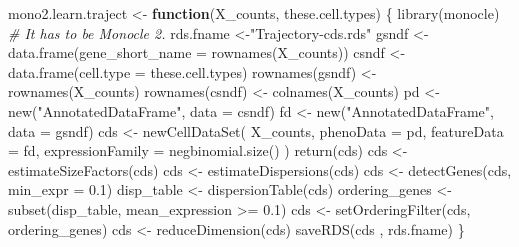 \documentclass[
  openany]{book}
\newenvironment{Shaded}{\begin{snugshade}}{\end{snugshade}}
\newcommand{\AttributeTok}[1]{\textcolor[rgb]{0.77,0.63,0.00}{#1}}
\newcommand{\CommentTok}[1]{\textcolor[rgb]{0.56,0.35,0.01}{\textit{#1}}}
\newcommand{\ControlFlowTok}[1]{\textcolor[rgb]{0.13,0.29,0.53}{\textbf{#1}}}
\newcommand{\FloatTok}[1]{\textcolor[rgb]{0.00,0.00,0.81}{#1}}
\newcommand{\FunctionTok}[1]{\textcolor[rgb]{0.00,0.00,0.00}{#1}}
\newcommand{\NormalTok}[1]{#1}
\newcommand{\OtherTok}[1]{\textcolor[rgb]{0.56,0.35,0.01}{#1}}
\newcommand{\SpecialCharTok}[1]{\textcolor[rgb]{0.00,0.00,0.00}{#1}}
\newcommand{\StringTok}[1]{\textcolor[rgb]{0.31,0.60,0.02}{#1}}
\begin{document}
\begin{Shaded}
\begin{Highlighting}[]
\NormalTok{mono2.learn.traject }\OtherTok{\textless{}{-}}
  \ControlFlowTok{function}\NormalTok{(X\_counts,}
\NormalTok{           these.cell.types) \{}
    \FunctionTok{library}\NormalTok{(monocle) }\CommentTok{\# It has to be Monocle 2.}
\NormalTok{    rds.fname }\OtherTok{\textless{}{-}}\StringTok{"Trajectory{-}cds.rds"}
\NormalTok{    gsndf }\OtherTok{\textless{}{-}} \FunctionTok{data.frame}\NormalTok{(}\AttributeTok{gene\_short\_name =} \FunctionTok{rownames}\NormalTok{(X\_counts))}
\NormalTok{    csndf }\OtherTok{\textless{}{-}} \FunctionTok{data.frame}\NormalTok{(}\AttributeTok{cell.type =}\NormalTok{ these.cell.types)}
    \FunctionTok{rownames}\NormalTok{(gsndf) }\OtherTok{\textless{}{-}} \FunctionTok{rownames}\NormalTok{(X\_counts)}
    \FunctionTok{rownames}\NormalTok{(csndf) }\OtherTok{\textless{}{-}} \FunctionTok{colnames}\NormalTok{(X\_counts)}
\NormalTok{    pd }\OtherTok{\textless{}{-}} \FunctionTok{new}\NormalTok{(}\StringTok{"AnnotatedDataFrame"}\NormalTok{, }\AttributeTok{data =}\NormalTok{ csndf)}
\NormalTok{    fd }\OtherTok{\textless{}{-}} \FunctionTok{new}\NormalTok{(}\StringTok{"AnnotatedDataFrame"}\NormalTok{, }\AttributeTok{data =}\NormalTok{ gsndf)}
\NormalTok{    cds }\OtherTok{\textless{}{-}}
      \FunctionTok{newCellDataSet}\NormalTok{(}
\NormalTok{        X\_counts,}
        \AttributeTok{phenoData =}\NormalTok{ pd,}
        \AttributeTok{featureData =}\NormalTok{ fd,}
        \AttributeTok{expressionFamily =} \FunctionTok{negbinomial.size}\NormalTok{()}
\NormalTok{      )}
    \FunctionTok{return}\NormalTok{(cds)}
\NormalTok{    cds }\OtherTok{\textless{}{-}} \FunctionTok{estimateSizeFactors}\NormalTok{(cds)}
\NormalTok{    cds }\OtherTok{\textless{}{-}} \FunctionTok{estimateDispersions}\NormalTok{(cds)}
\NormalTok{    cds }\OtherTok{\textless{}{-}} \FunctionTok{detectGenes}\NormalTok{(cds, }\AttributeTok{min\_expr =} \FloatTok{0.1}\NormalTok{)}
\NormalTok{    disp\_table }\OtherTok{\textless{}{-}} \FunctionTok{dispersionTable}\NormalTok{(cds)}
\NormalTok{    ordering\_genes }\OtherTok{\textless{}{-}} \FunctionTok{subset}\NormalTok{(disp\_table, mean\_expression }\SpecialCharTok{\textgreater{}=} \FloatTok{0.1}\NormalTok{)}
\NormalTok{    cds }\OtherTok{\textless{}{-}} \FunctionTok{setOrderingFilter}\NormalTok{(cds, ordering\_genes)}
\NormalTok{    cds }\OtherTok{\textless{}{-}} \FunctionTok{reduceDimension}\NormalTok{(cds)}
    \FunctionTok{saveRDS}\NormalTok{(cds , rds.fname)}
\NormalTok{\}}
\end{Highlighting}
\end{Shaded}
\end{document}
